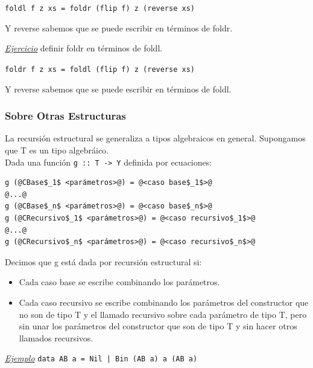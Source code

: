 \documentclass[12pt]{extarticle}
\def\ejemplo{\textit{\underline{Ejemplo} }}
\def\ejercicio{\textit{\underline{Ejercicio} }}
\newcommand\hsline[1]{\texttt{#1}}
\begin{document}
\hsline{foldl f z xs = foldr (flip f) z (reverse xs)}

Y reverse sabemos que se puede escribir en términos de foldr.

\ejercicio definir foldr en términos de foldl.

\hsline{foldr f z xs = foldl (flip f) z (reverse xs)}

Y reverse sabemos que se puede escribir en términos de foldl.

\subsubsection{Sobre Otras Estructuras}

La recursión estructural se generaliza a tipos algebraicos en general. Supongamos que T es un tipo algebráico. \\
Dada una función \hsline{g :: T -> Y} definida por ecuaciones:

\begin{verbatim}
g (@CBase$_1$ <parámetros>@) = @<caso base$_1$>@
@...@
g (@CBase$_n$ <parámetros>@) = @<caso base$_n$>@
g (@CRecursivo$_1$ <parámetros>@) = @<caso recursivo$_1$>@
@...@
g (@CRecursivo$_n$ <parámetros>@) = @<caso recursivo$_n$>@
\end{verbatim}

Decimos que g está dada por recursión estructural si:
\begin{itemize}
\vspace{-0.2cm}
\setlength\itemsep{-0.4em}
  \item Cada caso base se escribe combinando los parámetros.
  \item Cada caso recursivo se escribe combinando los parámetros del constructor que no son de tipo T y el llamado recursivo sobre cada parámetro de tipo T, pero sin unar los parámetros del constructor que son de tipo T y sin hacer otros llamados recursivos.
\end{itemize}

\ejemplo \hsline{data AB a = Nil | Bin (AB a) a (AB a)}
\end{document}
